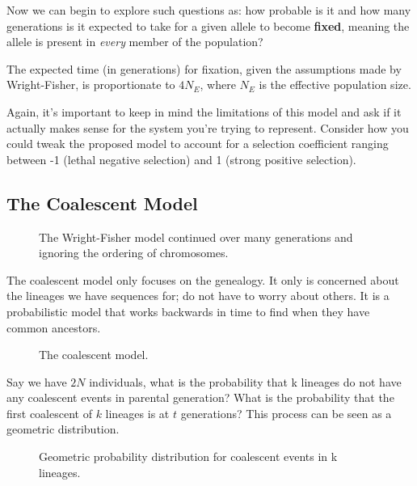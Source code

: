Now we can begin to explore such questions as: how probable is it and how many generations is it expected to take for a given allele to become \textbf{fixed}, meaning the allele is present in \textit{every} member of the population?

The expected time (in generations) for fixation, given the assumptions made by Wright-Fisher, is proportionate to $4N_{E}$, where $N_{E}$ is the effective population size.

Again, it's important to keep in mind the limitations of this model and ask if it actually makes sense for the system you're trying to represent. Consider how you could tweak the proposed model to account for a selection coefficient ranging between -1 (lethal negative selection) and 1 (strong positive selection).

\subsection{The Coalescent Model}



\begin{figure} [ht!] 
  \centering 
  \caption{The Wright-Fisher model continued over many generations and
    ignoring the ordering of chromosomes.}
  \label{Fig14_FisherWrightManyGenerations}
\end{figure} 

The coalescent model only focuses on the genealogy. It only is
concerned about the lineages we have sequences for; do not have to
worry about others. It is a probabilistic model that works backwards
in time to find when they have common ancestors.

\begin{figure} [ht!] 
  \centering 
  \caption{The coalescent model.}
  \label{Fig15_CoalescentModel}
\end{figure} 

Say we have $2N$ individuals, what is the probability that k lineages
do not have any coalescent events in parental generation? What is the
probability that the first coalescent of $k$ lineages is at $t$
generations? This process can be seen as a geometric distribution.

\begin{figure} [ht!] 
  \centering 
  \caption{Geometric probability distribution for coalescent events in k lineages.}
  \label{Fig16_CoalescentProbDist}
\end{figure} 

